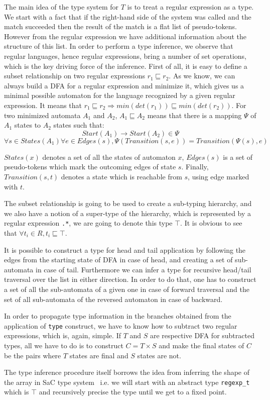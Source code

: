 The main idea of the type system for $T$ is to treat a regular
expression as a type.  We start with a fact that if the 
right-hand side of the system was called and the match succeeded
then the result of the match is a flat list of pseudo-tokens.
However from the regular expression we have additional information
about the structure of this list.  In order to perform a type 
inference, we observe that regular languages, hence regular 
expressions, bring a number of set operations, which is the key
driving force of the inference.  First of all, it is easy to
define a subset relationship on two regular expressions
$r_1 \sqsubseteq r_2$.  As we know, we can always build a DFA for
a regular expression and minimize it, which gives us a minimal
possible automaton for the language recognized by a given regular
expression.  It means that $r_1 \sqsubseteq r_2 \Rightarrow 
min (det (r_1)) \sqsubseteq min (det (r_2))$.  For two minimized 
automata $A_1$ and $A_2$, $A_1 \sqsubseteq A_2$ means that there
is a mapping $\Psi$ of $A_1$ states to $A_2$ states such that:
\[
    Start (A_1) \to Start (A_2) \in \Psi
\]
\[
    \forall s \in States (A_1) \forall e \in Edges (s),
    \Psi (Transition (s, e)) = Transition (\Psi (s), e)
\]

$States (x)$ denotes a set of all the states of automaton $x$,
$Edges (s)$ is a set of pseudo-tokens which mark the outcoming
edges of state $s$.  Finally, $Transition (s, t)$ denotes a
state which is reachable from $s$, using edge marked with $t$.

The subset relationship is going to be used to create a sub-typing
hierarchy, and we also have a notion of a super-type of
the hierarchy, which is represented by a regular expression \verb|.*|,
we are going to denote this type $\top$.  It is obvious to see that
$\forall t_i \in R, t_i \sqsubseteq \top$.

It is possible to construct a type for head and tail application
by following the edges from the starting state of DFA in case of
head, and creating a set of sub-automata in case of tail.
Furthermore we can infer a type for recursive head/tail traversal
over the list in either direction.  In order to do that, one has
to construct a set of all the sub-automata of a given one in 
case of forward traversal and the set of all sub-automata of
the reversed automaton in case of backward.

In order to propagate type information in the branches obtained from the
application of \verb|type| construct, we have to know how to subtract
two regular expressions, which is, again, simple.  If $T$ and $S$  are
respective DFA for subtracted types, all we have to do is to construct
$C = T \times S$ and make the final states of $C$ be the pairs where $T$
states are final and $S$ states are not. 

The type inference procedure itself borrows the idea from inferring
the shape of the array in SaC type system~\cite{sac2c} i.e. we will
start with an abstract type \verb|regexp_t|
which is $\top$ and recursively precise the type until we get to
a fixed point.







